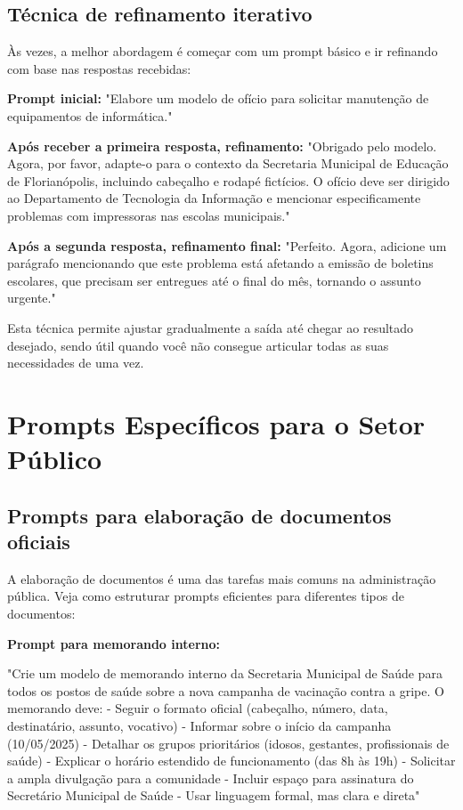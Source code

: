 \documentclass[12pt,a4paper]{book}
\begin{document}
\subsection{Técnica de refinamento iterativo}

Às vezes, a melhor abordagem é começar com um prompt básico e ir refinando com base nas respostas recebidas:

\begin{tcolorbox}[exemplo]
\textbf{Prompt inicial:}
"Elabore um modelo de ofício para solicitar manutenção de equipamentos de informática."

\textbf{Após receber a primeira resposta, refinamento:}
"Obrigado pelo modelo. Agora, por favor, adapte-o para o contexto da Secretaria Municipal de Educação de Florianópolis, incluindo cabeçalho e rodapé fictícios. O ofício deve ser dirigido ao Departamento de Tecnologia da Informação e mencionar especificamente problemas com impressoras nas escolas municipais."

\textbf{Após a segunda resposta, refinamento final:}
"Perfeito. Agora, adicione um parágrafo mencionando que este problema está afetando a emissão de boletins escolares, que precisam ser entregues até o final do mês, tornando o assunto urgente."
\end{tcolorbox}

Esta técnica permite ajustar gradualmente a saída até chegar ao resultado desejado, sendo útil quando você não consegue articular todas as suas necessidades de uma vez.

\section{Prompts Específicos para o Setor Público}

\subsection{Prompts para elaboração de documentos oficiais}

A elaboração de documentos é uma das tarefas mais comuns na administração pública. Veja como estruturar prompts eficientes para diferentes tipos de documentos:

\begin{tcolorbox}[exemplo]
\textbf{Prompt para memorando interno:}

"Crie um modelo de memorando interno da Secretaria Municipal de Saúde para todos os postos de saúde sobre a nova campanha de vacinação contra a gripe. O memorando deve:
- Seguir o formato oficial (cabeçalho, número, data, destinatário, assunto, vocativo)
- Informar sobre o início da campanha (10/05/2025)
- Detalhar os grupos prioritários (idosos, gestantes, profissionais de saúde)
- Explicar o horário estendido de funcionamento (das 8h às 19h)
- Solicitar a ampla divulgação para a comunidade
- Incluir espaço para assinatura do Secretário Municipal de Saúde
- Usar linguagem formal, mas clara e direta"
\end{tcolorbox}
\end{document}
